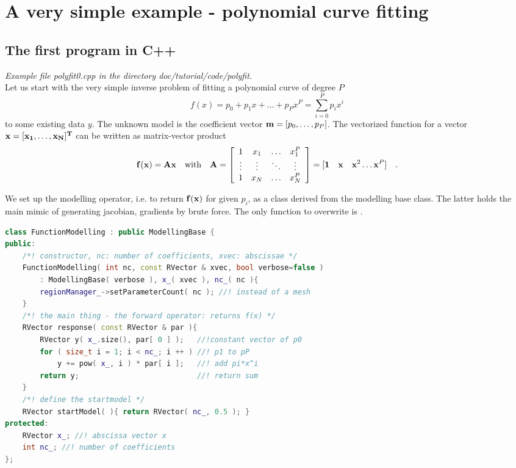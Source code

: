 \section{A very simple example - polynomial curve fitting}\label{sec:simple}
\subsection{The first program in C++}
{\em Example file polyfit0.cpp in the directory doc/tutorial/code/polyfit.}\\
Let us start with the very simple inverse problem of fitting a polynomial curve of degree $P$
\[ f(x) = p_0 +p_1 x + \ldots + p_P x^P= \sum\limits_{i=0}^{P} p_i x^i \]
to some existing data $y$. The unknown model is the coefficient vector $\mathbf{m}=[p_0,\ldots,p_P]$.
The vectorized function for a vector $\bf x=[x_1,\ldots,x_N]^T$ can be written as matrix-vector product
\begin{equation}\label{eq:yAx}
  \mathbf{f}(\mathbf{x}) = \mathbf{A} \mathbf{x} \quad\mbox{with}\quad \mathbf{A}=\left[ \begin{array}{cccc}
  1 & x_1 & \ldots & x_1^P \\ \vdots & \vdots & \ddots & \vdots \\ 1 & x_N & \ldots & x_N^P
  \end{array} \right] = [ {\bf 1}\quad \mathbf{x} \quad \mathbf{x}^2 \ldots \mathbf{x}^P ] \quad.
\end{equation}

We set up the modelling operator, i.e. to return $\mathbf{f}(\mathbf{x})$ for given $p_i$, as a class derived from the modelling base class. The latter holds the main mimic of generating jacobian, gradients by brute force. The only function to overwrite is .

\begin{lstlisting}[language=C++,morekeywords={RVector,ModellingBase}]
class FunctionModelling : public ModellingBase {
public:
    /*! constructor, nc: number of coefficients, xvec: abscissae */
    FunctionModelling( int nc, const RVector & xvec, bool verbose=false )
        : ModellingBase( verbose ), x_( xvec ), nc_( nc ){
        regionManager_->setParameterCount( nc ); //! instead of a mesh
    }
    /*! the main thing - the forward operator: returns f(x) */
    RVector response( const RVector & par ){
        RVector y( x_.size(), par[ 0 ] );   //!constant vector of p0
        for ( size_t i = 1; i < nc_; i ++ ) //! p1 to pP
            y += pow( x_, i ) * par[ i ];   //! add pi*x^i
        return y;                           //! return sum
    }
    /*! define the startmodel */
    RVector startModel( ){ return RVector( nc_, 0.5 ); }
protected:
    RVector x_; //! abscissa vector x
    int nc_; //! number of coefficients
};
\end{lstlisting}

